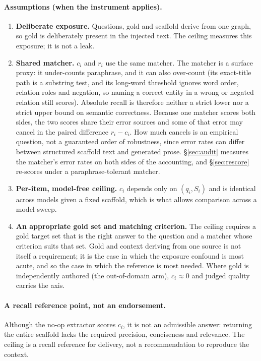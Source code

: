 \documentclass[10pt,twocolumn]{article}
\begin{document}
\paragraph{Assumptions (when the instrument applies).}
\begin{enumerate}[label=(A\arabic*),topsep=2pt,itemsep=1pt,leftmargin=2.4em]
\item \textbf{Deliberate exposure.} Questions, gold and scaffold derive from one graph, so gold is deliberately present in the injected text. The ceiling measures this exposure; it is not a leak.
\item \textbf{Shared matcher.} $c_i$ and $r_i$ use the same matcher. The matcher is a surface proxy: it under-counts paraphrase, and it can also over-count (its exact-title path is a substring test, and its long-word threshold ignores word order, relation roles and negation, so naming a correct entity in a wrong or negated relation still scores). Absolute recall is therefore neither a strict lower nor a strict upper bound on semantic correctness. Because one matcher scores both sides, the two scores share their error sources and some of that error may cancel in the paired difference $r_i-c_i$. How much cancels is an empirical question, not a guaranteed order of robustness, since error rates can differ between structured scaffold text and generated prose. \S\ref{sec:audit} measures the matcher's error rates on both sides of the accounting, and \S\ref{sec:rescore} re-scores under a paraphrase-tolerant matcher.
\item \textbf{Per-item, model-free ceiling.} $c_i$ depends only on $(q_i,S_i)$ and is identical across models given a fixed scaffold, which is what allows comparison across a model sweep.
\item \textbf{An appropriate gold set and matching criterion.} The ceiling requires a gold target set that is the right answer to the question and a matcher whose criterion suits that set. Gold and context deriving from one source is not itself a requirement; it is the case in which the exposure confound is most acute, and so the case in which the reference is most needed. Where gold is independently authored (the out-of-domain arm), $c_i\approx0$ and judged quality carries the axis.
\end{enumerate}

\paragraph{A recall reference point, not an endorsement.} Although the no-op extractor scores $c_i$, it is not an admissible answer: returning the entire scaffold lacks the required precision, conciseness and relevance. The ceiling is a recall reference for delivery, not a recommendation to reproduce the context.
\end{document}
